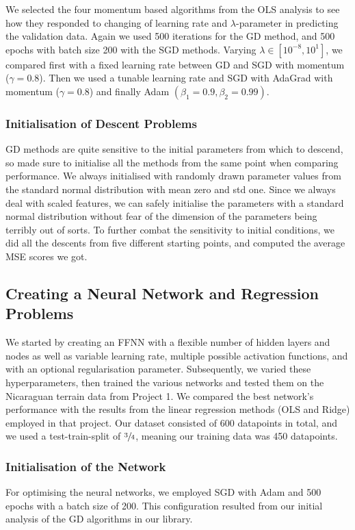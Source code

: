        We selected the four momentum based algorithms from the OLS analysis to see how they responded to changing of learning rate and $\lambda$-parameter in predicting the validation data. Again we used 500 iterations for the GD method, and 500 epochs with batch size 200 with the SGD methods. Varying $\lambda \in [10^{-8}, 10^1]$, we compared first with a fixed learning rate between GD and SGD with momentum ($\gamma=0.8$). Then we used a tunable learning rate and SGD with AdaGrad with momentum ($\gamma=0.8$) and finally Adam $(\beta_1=0.9, \beta_2=0.99)$.

    \subsubsection{Initialisation of Descent Problems}
        GD methods are quite sensitive to the initial parameters from which to descend, so made sure to initialise all the methods from the same point when comparing performance. We always initialised with randomly drawn parameter values from the standard normal distribution with mean zero and std one. Since we always deal with scaled features, we can safely initialise the parameters with a standard normal distribution without fear of the dimension of the parameters being terribly out of sorts. To further combat the sensitivity to initial conditions, we did all the descents from five different starting points, and computed the average MSE scores we got.

\subsection{Creating a Neural Network and Regression Problems}
    We started by creating an FFNN with a flexible number of hidden layers and nodes as well as variable learning rate, multiple possible activation functions, and with an optional regularisation parameter. Subsequently, we varied these hyperparameters, then trained the various networks and tested them on the Nicaraguan terrain data from Project 1. We compared the best network's performance with the results from the linear regression methods (OLS and Ridge) employed in that project. Our dataset consisted of 600 datapoints in total, and we used a test-train-split of $\sfrac{3}{4}$, meaning our training data was 450 datapoints. 
    
    \subsubsection{Initialisation of the Network}
         For optimising the neural networks, we employed SGD with Adam and 500 epochs with a batch size of 200. This configuration resulted from our initial analysis of the GD algorithms in our library.


